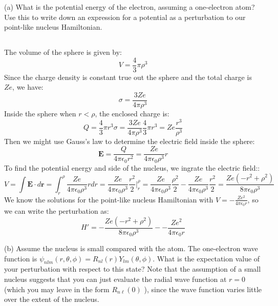 \documentclass[12pt]{article}
\begin{document}
(a) What is the potential energy of the electron, assuming a one-electron atom? Use this to write down an expression for a potential as a perturbation to our point-like nucleus Hamiltonian.
\subsection{}
The volume of the sphere is given by:
\begin{equation}
  V = \frac{4}{3} \pi \rho^3
\end{equation}
Since the charge density is constant true out the sphere and the total charge is $Ze$, we have:
\begin{equation}
  \sigma  = \frac{3Ze}{4\pi\rho^3}
\end{equation}
Inside the sphere when $r < \rho$, the enclosed charge is:
\begin{equation}
  Q = \frac{4}{3} \pi r^3 \sigma = \frac{3Ze}{4\pi\rho^3} \frac{4}{3} \pi r^3 = Ze \frac{r^3}{\rho^3}
\end{equation}
Then we might use Gauss's law to determine the electric field inside the sphere:
\begin{equation}
  \mathbf{E} = \frac{Q}{4\pi\epsilon_0 r^2} = \frac{Ze}{4\pi\epsilon_0\rho^3} r
\end{equation}
To find the potential energy and side of the nucleus, we ingrate the electric field::
\begin{equation}
  V = \int \mathbf{E} \cdot d\mathbf{r} = \int_{r}^{\rho } \frac{Ze}{4\pi\epsilon_0\rho^3} r dr = \frac{Ze}{4\pi\epsilon_0\rho^3} \frac{r^2}{2} \Big|_{r}^{\rho} = \frac{Ze}{4\pi\epsilon_0\rho^3} \frac{\rho^2}{2} - \frac{Ze}{4\pi\epsilon_0\rho^3} \frac{r^2}{2} = \frac{Ze(-r^2 + \rho^2)}{8\pi\epsilon_0\rho^3}
\end{equation}
We know the solutions for the point-like nucleus Hamiltonian with $V = -\frac{Ze^2}{4\pi\epsilon_0 r}$, so we can write the perturbation as:
\begin{equation}
  H' = -\frac{Ze(-r^2 + \rho^2)}{8\pi\epsilon_0\rho^3} - -\frac{Ze^2}{4\pi\epsilon_0 r}
\end{equation}



(b) Assume the nucleus is small compared with the atom. The one-electron wave function is $\psi_{n l m}(r, \theta, \phi)=R_{n l}(r) Y_{l m}(\theta, \phi)$. What is the expectation value of your perturbation with respect to this state? Note that the assumption of a small nucleus suggests that you can just evaluate the radial wave function at $r=0$ (which you may leave in the form $R_{n \ell}(0)$ ), since the wave function varies little over the extent of the nucleus.
\end{document}
